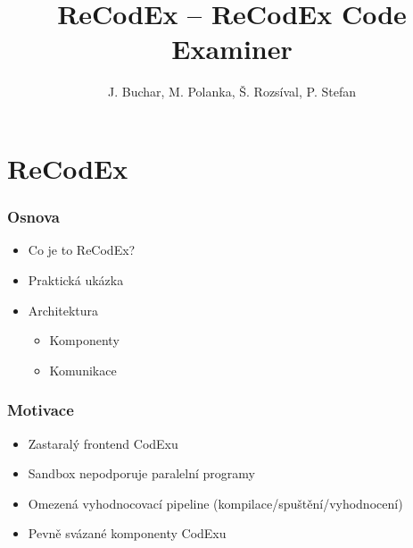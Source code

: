 \documentclass{beamer}
\begin{document}

\title[ReCodEx -- ReCodEx Code Examiner] %
{ReCodEx -- ReCodEx Code Examiner}
\author[Buchar, Polanka, Rozsíval, Stefan]{J. Buchar, M. Polanka, Š. Rozsíval, P. Stefan}
\date[3. 12. 2016]{} %
\subject{Computer Science}

\frame{\titlepage}

\section{ReCodEx}

\begin{frame}
	\frametitle{Osnova}
	\begin{itemize}
		\item Co je to ReCodEx?
		\item Praktická ukázka
		\item Architektura
		\begin{itemize}
			\item Komponenty
			\item Komunikace
		\end{itemize}
	\end{itemize}
\end{frame}

\begin{frame}
	\frametitle{Motivace}
	\begin{itemize}
		\item Zastaralý frontend CodExu
		\item Sandbox nepodporuje paralelní programy
		\item Omezená vyhodnocovací pipeline (kompilace/spuštění/vyhodnocení)
		\item Pevně svázané komponenty CodExu
	\end{itemize}
\end{frame}
\end{document}
